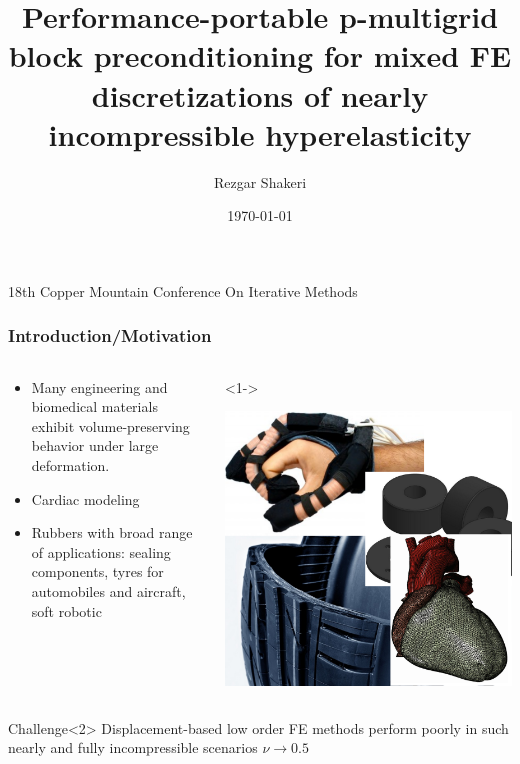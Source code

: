 \documentclass{beamer}
\title{Performance-portable p-multigrid block preconditioning for mixed FE discretizations of nearly incompressible hyperelasticity} %
\author{Rezgar Shakeri} %
\institute[CU Boulder] %
{
Jed Brown, Jeremy L Thompson

\vspace{5mm}

University of Colorado Boulder \\ %
\medskip
\textit{Rezgar.Shakeri@colorado.edu} %
}
\date{\today} %
\begin{document}
\begin{frame}
\titlepage %
\centering
\small{18th Copper Mountain Conference On Iterative Methods} 
\end{frame}

\begin{frame}
	\frametitle{Introduction/Motivation}
	\begin{columns}
		\begin{column}{0.5\textwidth}
			\begin{itemize}
				\item<1-> Many engineering and biomedical materials exhibit volume-preserving behavior under large deformation.
				\item<1-> Cardiac modeling
				\item<1-> Rubbers with broad range of applications: sealing components, tyres for automobiles and aircraft, soft robotic
			\end{itemize}
		\end{column}
		\begin{column}{0.5\textwidth}<1->
			\begin{center}
				\includegraphics[width=.9\textwidth]{../figs/motivation.png}
			 \end{center}
		\end{column}
	\end{columns}

	\begin{alertblock}{Challenge}<2>
		Displacement-based low order FE methods perform poorly in such nearly and fully
		incompressible scenarios $\nu \to 0.5$
	\end{alertblock}
\end{frame}
\end{document}
